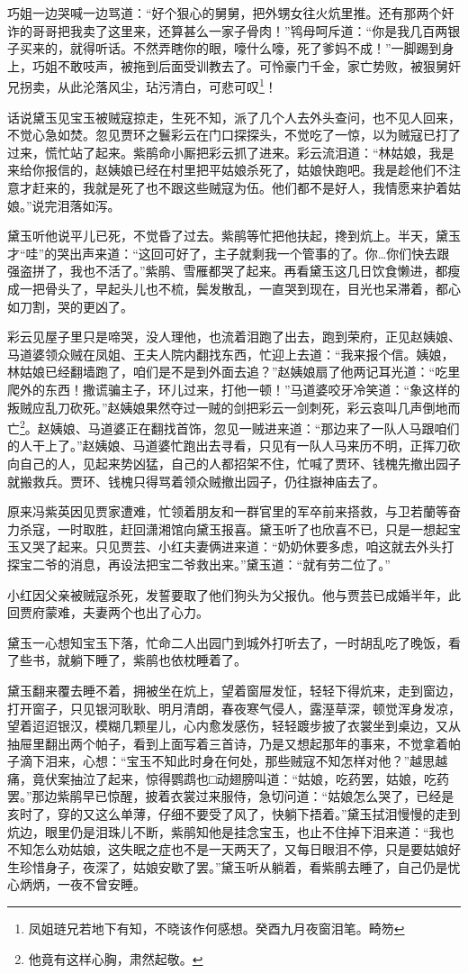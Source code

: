\documentclass[12pt,oneside]{book}
\begin{document}
巧姐一边哭喊一边骂道：“好个狠心的舅舅，把外甥女往火炕里推。还有那两个奸诈的哥哥把我卖了这里来，还算甚么一家子骨肉！”鸨母呵斥道：“你是我几百两银子买来的，就得听话。不然弄瞎你的眼，嚎什么嚎，死了爹妈不成！”一脚踢到身上，巧姐不敢吱声，被拖到后面受训教去了。可怜豪门千金，家亡势败，被狠舅奸兄拐卖，从此沦落风尘，玷污清白，可悲可叹\footnote{凤姐琏兄若地下有知，不晓该作何感想。癸酉九月夜窗泪笔。畸笏}！

话说黛玉见宝玉被贼寇掠走，生死不知，派了几个人去外头查问，也不见人回来，不觉心急如焚。忽见贾环之鬟彩云在门口探探头，不觉吃了一惊，以为贼寇已打了过来，慌忙站了起来。紫鹃命小厮把彩云抓了进来。彩云流泪道：“林姑娘，我是来给你报信的，赵姨娘已经在村里把平姑娘杀死了，姑娘快跑吧。我是趁他们不注意才赶来的，我就是死了也不跟这些贼寇为伍。他们都不是好人，我情愿来护着姑娘。”说完泪落如泻。

黛玉听他说平儿已死，不觉昏了过去。紫鹃等忙把他扶起，搀到炕上。半天，黛玉才“哇”的哭出声来道：“这回可好了，主子就剩我一个管事的了。你…你们快去跟强盗拼了，我也不活了。”紫鹃、雪雁都哭了起来。再看黛玉这几日饮食懒进，都瘦成一把骨头了，早起头儿也不梳，鬓发散乱，一直哭到现在，目光也呆滞着，都心如刀割，哭的更凶了。

彩云见屋子里只是啼哭，没人理他，也流着泪跑了出去，跑到荣府，正见赵姨娘、马道婆领众贼在凤姐、王夫人院内翻找东西，忙迎上去道：“我来报个信。姨娘，林姑娘已经翻墙跑了，咱们是不是到外面去追？”赵姨娘扇了他两记耳光道：“吃里爬外的东西！撒谎骗主子，环儿过来，打他一顿！”马道婆咬牙冷笑道：“象这样的叛贼应乱刀砍死。”赵姨娘果然夺过一贼的剑把彩云一剑刺死，彩云哀叫几声倒地而亡\footnote{他竟有这样心胸，肃然起敬。}。赵姨娘、马道婆正在翻找首饰，忽见一贼进来道：“那边来了一队人马跟咱们的人干上了。”赵姨娘、马道婆忙跑出去寻看，只见有一队人马来历不明，正挥刀砍向自己的人，见起来势凶猛，自己的人都招架不住，忙喊了贾环、钱槐先撤出园子就搬救兵。贾环、钱槐只得骂着领众贼撤出园子，仍往嶽神庙去了。

原来冯紫英因见贾家遭难，忙领着朋友和一群官里的军卒前来搭救，与卫若蘭等奋力杀寇，一时取胜，赶回潇湘馆向黛玉报喜。黛玉听了也欣喜不已，只是一想起宝玉又哭了起来。只见贾芸、小红夫妻俩进来道：“奶奶休要多虑，咱这就去外头打探宝二爷的消息，再设法把宝二爷救出来。”黛玉道：“就有劳二位了。”

小红因父亲被贼寇杀死，发誓要取了他们狗头为父报仇。他与贾芸已成婚半年，此回贾府蒙难，夫妻两个也出了心力。

黛玉一心想知宝玉下落，忙命二人出园门到城外打听去了，一时胡乱吃了晚饭，看了些书，就躺下睡了，紫鹃也依枕睡着了。

黛玉翻来覆去睡不着，拥被坐在炕上，望着窗屉发怔，轻轻下得炕来，走到窗边，打开窗子，只见银河耿耿、明月清朗，春夜寒气侵人，露溼草深，顿觉浑身发凉，望着迢迢银汉，模糊几颗星儿，心内愈发感伤，轻轻踱步披了衣裳坐到桌边，又从抽屉里翻出两个帕子，看到上面写着三首诗，乃是又想起那年的事来，不觉拿着帕子滴下泪来，心想：“宝玉不知此时身在何处，那些贼寇不知怎样对他？”越思越痛，竟伏案抽泣了起来，惊得鹦鹉也□动翅膀叫道：“姑娘，吃药罢，姑娘，吃药罢。”那边紫鹃早已惊醒，披着衣裳过来服侍，急切问道：“姑娘怎么哭了，已经是亥时了，穿的又这么单薄，仔细不要受了风了，快躺下捂着。”黛玉拭泪慢慢的走到炕边，眼里仍是泪珠儿不断，紫鹃知他是挂念宝玉，也止不住掉下泪来道：“我也不知怎么劝姑娘，这失眠之症也不是一天两天了，又每日眼泪不停，只是要姑娘好生珍惜身子，夜深了，姑娘安歇了罢。”黛玉听从躺着，看紫鹃去睡了，自己仍是忧心炳炳，一夜不曾安睡。
\end{document}
